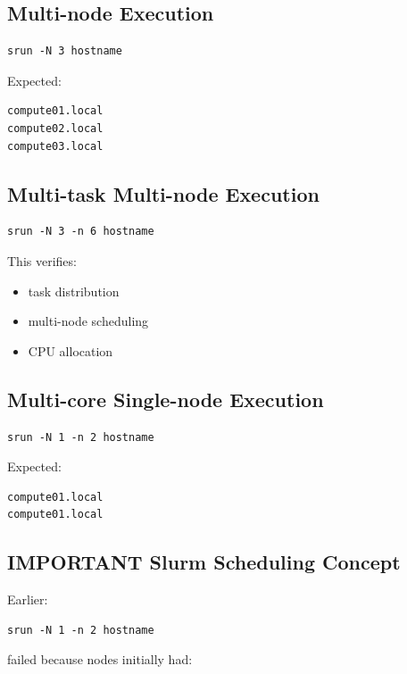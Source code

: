 \documentclass[11pt]{article}
\begin{document}
\subsection{Multi-node Execution}
\label{sec:org5235cbf}

\begin{verbatim}
srun -N 3 hostname
\end{verbatim}

Expected:

\begin{verbatim}
compute01.local
compute02.local
compute03.local
\end{verbatim}
\subsection{Multi-task Multi-node Execution}
\label{sec:org04f15cc}

\begin{verbatim}
srun -N 3 -n 6 hostname
\end{verbatim}

This verifies:

\begin{itemize}
\item task distribution
\item multi-node scheduling
\item CPU allocation
\end{itemize}
\subsection{Multi-core Single-node Execution}
\label{sec:orgdd5ef6f}

\begin{verbatim}
srun -N 1 -n 2 hostname
\end{verbatim}

Expected:

\begin{verbatim}
compute01.local
compute01.local
\end{verbatim}
\subsection{IMPORTANT Slurm Scheduling Concept}
\label{sec:org4316dbe}

Earlier:

\begin{verbatim}
srun -N 1 -n 2 hostname
\end{verbatim}

failed because nodes initially had:
\end{document}
